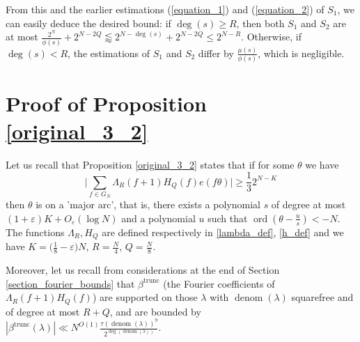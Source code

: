 \documentclass[11pt, reqno]{amsart}
\numberwithin{equation}{section}
\newcommand{\betatrunc}{\beta^{\trunc}}
\newcommand\eps{\varepsilon}
\newcommand\ord{\operatorname{ord}}
\newcommand\denom{\operatorname{denom}}
\newcommand\trunc{\operatorname{trunc}}
\begin{document}
From this and the earlier estimations (\ref{equation_1}) and (\ref{equation_2}) of $S_1$, we can easily deduce the desired bound: if $\deg(s)\geqslant R$, then both $S_1$ and $S_2$ are at most $\frac{2^{N}}{\phi(s)} + 2^{N-2Q}\lessapprox 2^{N-\deg(s)} + 2^{N-2Q} \leqslant 2^{N-R}$. Otherwise, if $\deg(s)<R$, the estimations of $S_1$ and $S_2$ differ by $\frac{\mu(s)}{\phi(s)}$, which is negligible.

\section{Proof of Proposition \ref{original_3_2}}
\label{section_3_2}
Let us recall that Proposition \ref{original_3_2} states that if for some $\theta$ we have
\begin{equation}
\label{assumption_3_2}
    \bigg| \sum_{f \in G_N} \Lambda_R(f+1)H_Q(f)  e(f\theta) \bigg| \geqslant \frac{1}{3}2^{N-K}
\end{equation}
then $\theta$ is on a 'major arc', that is, there exists a polynomial $s$ of degree at most $(1+\eps)K+O_{\eps}(\log N)$ and a polynomial $u$ such that $\ord(\theta - \frac{u}{s}) < -N$. The functions $\Lambda_R, H_Q$ are defined respectively in \ref{lambda_def}, \ref{h_def} and we have $K=\big(\frac{1}{8}-\eps\big)N$, $R=\frac{N}{4}$, $Q=\frac{N}{8}$.

Moreover, let us recall from considerations at the end of Section \ref{section_fourier_bounds} that $\betatrunc$ (the Fourier coefficients of $\Lambda_R(f+1)H_Q(f)$) are supported on those $\lambda$ with $\denom(\lambda)$ squarefree and of degree at most $R+Q$, and are bounded by $|\betatrunc(\lambda)| \ll N^{O(1)} \frac{\tau(\denom(\lambda))^9}{2^{\deg(\denom(\lambda))}}$.
\end{document}
